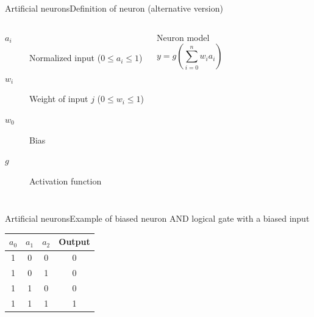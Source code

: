 \documentclass[10pt,compress]{beamer} %
\begin{document}
\begin{frame}{Artificial neurons}{Definition of neuron (alternative version)}
    

	\bigskip
    \begin{columns}
		\begin{description}
		\item[$a_i$] Normalized input ($0 \le a_i \le 1$)
		\item[$w_{i}$] Weight of input $j$ ($0 \le w_{i} \le 1$)
		\item[$w_0$] Bias
		\item[$g$] Activation function
		\end{description}

	   \begin{block}{Neuron model}
	   \vspace{-0.5cm}
	   \begin{equation*}
	   y=g\left( \sum_{i=0}^n w_{i} a_i \right)
	   \end{equation*}
	   \end{block}
    \end{columns}
\end{frame}

\begin{frame}{Artificial neurons}{Example of biased neuron}
	AND logical gate with a biased input

	\centering 

	\footnotesize{
		\centering \begin{tabular}{ccc|c}\hline
		$a_0$ & $a_1$ & $a_2$& Output\\\hline
		1    & 0     & 0     & 0\\
		1    & 0     & 1     & 0\\
		1    & 1     & 0     & 0\\
		1    & 1     & 1     & 1\\\hline
		\end{tabular}
	}
\end{frame}
\end{document}
